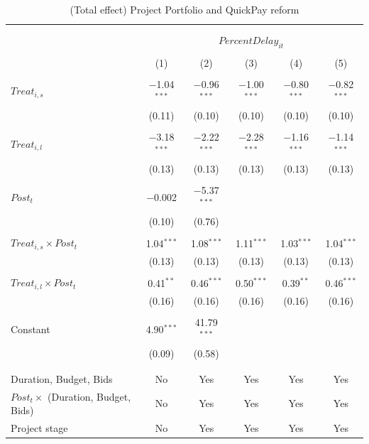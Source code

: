 \documentclass[
]{article}
\begin{document}
\begin{table}[H] \centering 
  \caption{(Total effect) Project Portfolio and QuickPay reform} 
  \label{} 
\small 
\begin{tabular}{@{\extracolsep{-2pt}}lccccc} 
\\[-1.8ex]\hline 
\hline \\[-1.8ex] 
\\[-1.8ex] & \multicolumn{5}{c}{$PercentDelay_{it}$  } \\ 
\\[-1.8ex] & (1) & (2) & (3) & (4) & (5)\\ 
\hline \\[-1.8ex] 
 $Treat_{i,s}$ & $-$1.04$^{***}$ & $-$0.96$^{***}$ & $-$1.00$^{***}$ & $-$0.80$^{***}$ & $-$0.82$^{***}$ \\ 
  & (0.11) & (0.10) & (0.10) & (0.10) & (0.10) \\ 
  & & & & & \\ 
 $Treat_{i,l}$ & $-$3.18$^{***}$ & $-$2.22$^{***}$ & $-$2.28$^{***}$ & $-$1.16$^{***}$ & $-$1.14$^{***}$ \\ 
  & (0.13) & (0.13) & (0.13) & (0.13) & (0.13) \\ 
  & & & & & \\ 
 $Post_t$ & $-$0.002 & $-$5.37$^{***}$ &  &  &  \\ 
  & (0.10) & (0.76) &  &  &  \\ 
  & & & & & \\ 
 $Treat_{i,s} \times Post_t$ & 1.04$^{***}$ & 1.08$^{***}$ & 1.11$^{***}$ & 1.03$^{***}$ & 1.04$^{***}$ \\ 
  & (0.13) & (0.13) & (0.13) & (0.13) & (0.13) \\ 
  & & & & & \\ 
 $Treat_{i,l} \times Post_t$ & 0.41$^{**}$ & 0.46$^{***}$ & 0.50$^{***}$ & 0.39$^{**}$ & 0.46$^{***}$ \\ 
  & (0.16) & (0.16) & (0.16) & (0.16) & (0.16) \\ 
  & & & & & \\ 
 Constant & 4.90$^{***}$ & 41.79$^{***}$ &  &  &  \\ 
  & (0.09) & (0.58) &  &  &  \\ 
  & & & & & \\ 
\hline \\[-1.8ex] 
Duration, Budget, Bids & No & Yes & Yes & Yes & Yes \\ 
$Post_t \times $  (Duration, Budget, Bids) & No & Yes & Yes & Yes & Yes \\ 
Project stage & No & Yes & Yes & Yes & Yes \\ 

\end{tabular}
\end{table}
\end{document}
